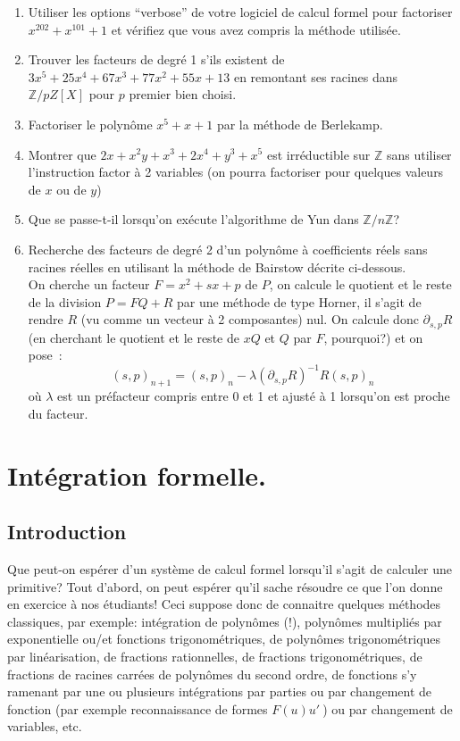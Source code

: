 \documentclass[a4paper,11pt]{book}
\begin{document}
\begin{giacjshere}
\begin{enumerate}
\item Utiliser les options ``verbose'' de votre logiciel de calcul formel
pour factoriser $x^{202}+x^{101}+1$ et vérifiez que vous avez compris
la méthode utilisée.
\item Trouver les facteurs de degré 1 s'ils existent de
$3x^5+25x^4+67x^3+77x^2+55x+13$ en remontant ses racines
dans $\mathbb{Z}/pZ[X]$ pour $p$ premier bien choisi.
\item Factoriser le polynôme $x^5+x+1$ par la méthode 
de Berlekamp.
\item Montrer que $2x+x^2y+x^3+2x^4+y^3+x^5$ est irréductible sur $\mathbb{Z}$
sans utiliser l'instruction factor à 2 variables (on pourra factoriser 
pour quelques valeurs de $x$ ou de $y$)

\item Que se passe-t-il lorsqu'on ex\'ecute l'algorithme de Yun
dans $\mathbb{Z}/n\mathbb{Z}$?

\item Recherche des facteurs de degré 2 d'un polynôme à coefficients
réels sans racines réelles en utilisant la méthode de Bairstow décrite
ci-dessous.\\
On cherche un facteur $F=x^2+sx+p$ de $P$, on calcule le quotient et le reste
de la division $P=FQ+R$ par une méthode de type Horner, il s'agit de 
rendre $R$ (vu comme un vecteur à 2 composantes) nul. On calcule
donc $\partial_{s,p} R$ (en cherchant le quotient et le reste
de $xQ$ et $Q$ par $F$, pourquoi?) et on pose~:
\[(s,p)_{n+1}=(s,p)_n- \lambda (\partial_{s,p} R)^{-1} R (s,p)_n\]
où $\lambda$ est un préfacteur compris entre 0 et 1 et ajusté à 1 
lorsqu'on est proche du facteur.


\end{enumerate}

\pagebreak

\chapter{Int\'egration formelle.}\label{sec:intg} 
\section{Introduction}
Que peut-on espérer d'un système de calcul formel lorsqu'il s'agit
de calculer une primitive? Tout d'abord, on peut espérer qu'il
sache résoudre ce que l'on donne en exercice à nos étudiants!
Ceci suppose donc de connaitre quelques méthodes classiques, par
exemple: intégration de polynômes (!), polynômes multipliés par exponentielle
ou/et fonctions trigonométriques, de polynômes trigonométriques par
linéarisation, de fractions rationnelles,
de fractions trigonométriques, de fractions de racines carrées de 
polynômes du second ordre, de fonctions s'y ramenant par une ou plusieurs
intégrations par parties ou par
changement de fonction (par exemple reconnaissance de formes $F(u)u'\ $)
ou par changement de variables, etc.


\end{giacjshere}
\end{document}
